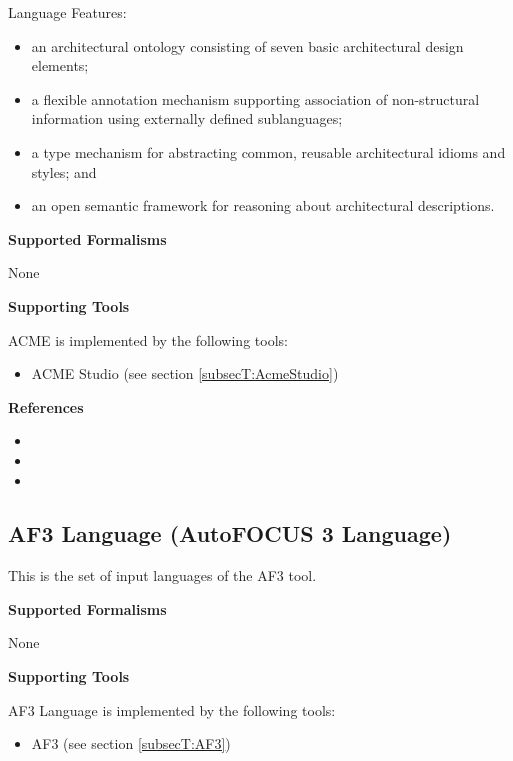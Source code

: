 Language Features:
\begin{itemize}
    \item an architectural ontology consisting of seven basic architectural design elements;
    \item a flexible annotation mechanism supporting association of non-structural information using externally defined sublanguages;
    \item a type mechanism for abstracting common, reusable architectural idioms and styles; and
    \item an open semantic framework for reasoning about architectural descriptions.
\end{itemize}

\textbf{Supported Formalisms}

None


\textbf{Supporting Tools}

ACME is implemented by the following tools:
\begin{itemize}
	\item ACME Studio (see section \ref{subsecT:AcmeStudio})
\end{itemize}


\textbf{References}
\begin{itemize}
	
\item {}
	
\item {}
	
\item {}
\end{itemize}



\subsection{AF3 Language (AutoFOCUS 3 Language)}
\label{subsecL:AF3Language}


This is the set of input languages of the AF3 tool.

\textbf{Supported Formalisms}

None


\textbf{Supporting Tools}

AF3 Language is implemented by the following tools:
\begin{itemize}
	\item AF3 (see section \ref{subsecT:AF3})
\end{itemize}


